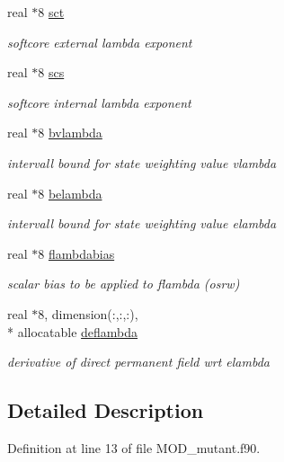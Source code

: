 \begin{DoxyCompactItemize}
real $\ast$8 \hyperlink{classmutant_a2832686319ff2d15ef7f57c25b0e52f5}{sct}
\begin{DoxyCompactList}\small\item\em softcore external lambda exponent \end{DoxyCompactList}\item 
real $\ast$8 \hyperlink{classmutant_a1ba7a9ba70c79b70c1b56e81810237c6}{scs}
\begin{DoxyCompactList}\small\item\em softcore internal lambda exponent \end{DoxyCompactList}\item 
real $\ast$8 \hyperlink{classmutant_a2fc9516c774c42c250c40ea663059747}{bvlambda}
\begin{DoxyCompactList}\small\item\em intervall bound for state weighting value vlambda \end{DoxyCompactList}\item 
real $\ast$8 \hyperlink{classmutant_a6e1ac466a4ab5d849a19af6216765580}{belambda}
\begin{DoxyCompactList}\small\item\em intervall bound for state weighting value elambda \end{DoxyCompactList}\item 
real $\ast$8 \hyperlink{classmutant_a5497c64fcddcac4e3da0f8aca807d3ed}{flambdabias}
\begin{DoxyCompactList}\small\item\em scalar bias to be applied to flambda (osrw) \end{DoxyCompactList}\item 
real $\ast$8, dimension(\-:,\-:,\-:), \\*
allocatable \hyperlink{classmutant_a649a0a7d93f9794e9bcd1ce69926cef9}{deflambda}
\begin{DoxyCompactList}\small\item\em derivative of direct permanent field wrt elambda \end{DoxyCompactList}\end{DoxyCompactItemize}


\subsection{Detailed Description}


Definition at line 13 of file M\-O\-D\-\_\-mutant.\-f90.



